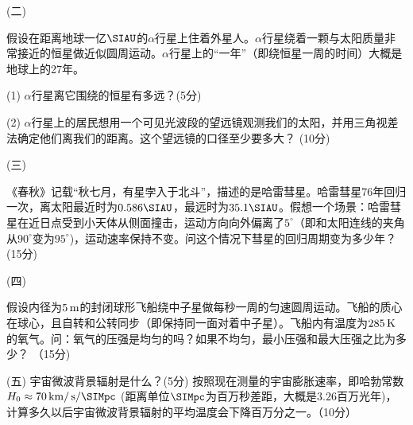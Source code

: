 \documentclass[12pt,CJK]{article}
\begin{document}
  
\item[(二)]{假设在距离地球一亿$\SIAU$的$\alpha$行星上住着外星人。$\alpha$行星绕着一颗与太阳质量非常接近的恒星做近似圆周运动。$\alpha$行星上的``一年''（即绕恒星一周的时间）大概是地球上的27年。
  \bitem
\item[(1)]{$\alpha$行星离它围绕的恒星有多远？(5分)}
\item[(2)]{$\alpha$行星上的居民想用一个可见光波段的望远镜观测我们的太阳，并用三角视差法确定他们离我们的距离。这个望远镜的口径至少要多大？ (10分)}
  \eitem

  \vspace{1in}
  }

  
\item[(三)]{《春秋》记载“秋七月，有星孛入于北斗”，描述的是哈雷彗星。哈雷彗星76年回归一次，离太阳最近时为$0.586\SIAU$，最远时为$35.1\SIAU$。假想一个场景：哈雷彗星在近日点受到小天体从侧面撞击，运动方向向外偏离了$5^\circ$（即和太阳连线的夹角从$90^\circ$变为$95^\circ$)，运动速率保持不变。问这个情况下彗星的回归周期变为多少年？ (15分)

  \vspace{2in}    
    
  }


  
\item[(四)]{
  假设内径为$5\,\mathrm{m}$的封闭球形飞船绕中子星做每秒一周的匀速圆周运动。飞船的质心在球心，且自转和公转同步（即保持同一面对着中子星）。飞船内有温度为$285\,\mathrm{K}$的氧气。问：氧气的压强是均匀的吗？如果不均匀，最小压强和最大压强之比为多少？ （15分)

  \vspace{2in}    
}
 

 

\item[(五)]{宇宙微波背景辐射是什么？(5分) 按照现在测量的宇宙膨胀速率，即哈勃常数$H_0 \approx 70 \SIkm/\SIs/\SIMpc$ (距离单位$\SIMpc$为百万秒差距，大概是$3.26$百万光年)，计算多久以后宇宙微波背景辐射的平均温度会下降百万分之一。（10分）
}
\eitem

 


\ech
\end{document}
